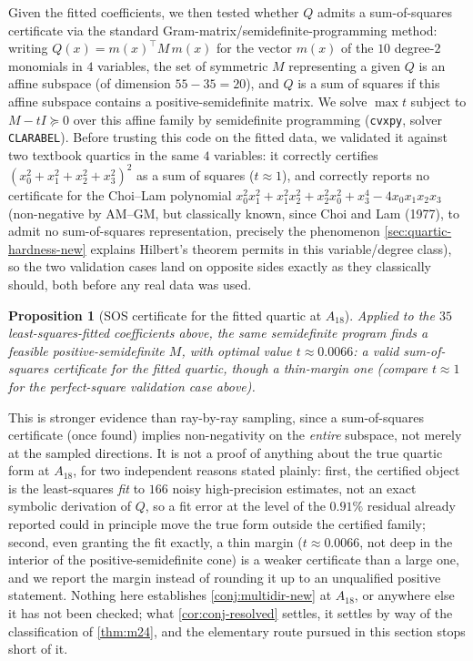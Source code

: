 \documentclass[11pt,reqno]{amsart}
\renewcommand{\_}{\origunderscore\allowbreak}
\numberwithin{equation}{section}
\theoremstyle{plain}
\newtheorem{prop}[thm]{Proposition}
\theoremstyle{definition}
\theoremstyle{remark}
\begin{document}
Given the fitted coefficients, we then tested whether $Q$ admits a
sum-of-squares certificate via the standard Gram-matrix/semidefinite-programming
method: writing $Q(x)=m(x)^\top M\, m(x)$ for the vector $m(x)$ of the
$10$ degree-$2$ monomials in $4$ variables, the set of symmetric $M$
representing a given $Q$ is an affine subspace (of dimension
$55-35=20$), and $Q$ is a sum of squares if this affine subspace
contains a positive-semidefinite matrix. We solve
$\max t$ subject to $M-tI\succeq 0$ over this affine family by
semidefinite programming (\texttt{cvxpy}, solver \texttt{CLARABEL}).
Before trusting this code on the fitted data, we validated it against
two textbook quartics in the same $4$ variables: it correctly certifies
$(x_0^2+x_1^2+x_2^2+x_3^2)^2$ as a sum of squares ($t\approx 1$), and
correctly reports no certificate for the Choi--Lam polynomial
$x_0^2x_1^2+x_1^2x_2^2+x_2^2x_0^2+x_3^4-4x_0x_1x_2x_3$
(non-negative by AM--GM, but classically known, since Choi and Lam
(1977), to admit no sum-of-squares representation, precisely the
phenomenon \cref{sec:quartic-hardness-new} explains Hilbert's theorem
permits in this variable/degree class), so the two validation cases
land on opposite sides exactly as they classically should, both before
any real data was used.

\begin{prop}[SOS certificate for the fitted quartic at $A_{18}$]\label{prop:gram-sos-A18}
Applied to the $35$ least-squares-fitted coefficients above, the same
semidefinite program finds a feasible positive-semidefinite $M$, with
optimal value $t\approx 0.0066$: a valid sum-of-squares certificate for
the fitted quartic, though a thin-margin one (compare $t\approx 1$ for
the perfect-square validation case above).
\end{prop}

This is stronger evidence than ray-by-ray sampling, since a
sum-of-squares certificate (once found) implies non-negativity on the
\emph{entire} subspace, not merely at the sampled directions. It is not
a proof of anything about the true quartic form at $A_{18}$, for two
independent reasons stated plainly: first, the certified object is the
least-squares \emph{fit} to $166$ noisy high-precision estimates, not an
exact symbolic derivation of $Q$, so a fit error at the level of the
$0.91\%$ residual already reported could in principle move the true
form outside the certified family; second, even granting the fit
exactly, a thin margin ($t\approx 0.0066$, not deep in the interior of
the positive-semidefinite cone) is a weaker certificate than a large
one, and we report the margin instead of rounding it up to an
unqualified positive statement. Nothing here establishes
\cref{conj:multidir-new} at $A_{18}$, or anywhere else it has not been
checked; what \cref{cor:conj-resolved} settles, it settles by way of
the classification of \cref{thm:m24}, and the elementary route pursued
in this section stops short of it.
\end{document}
